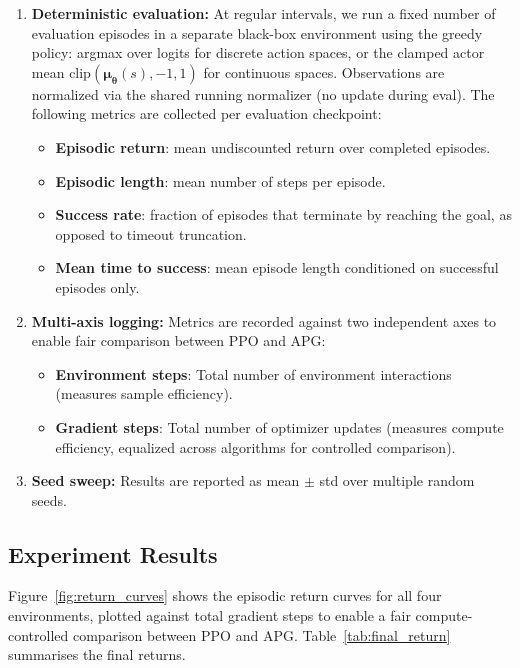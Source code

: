 \documentclass[11pt,a4paper]{article}
\newcommand{\btheta}{\bm{\theta}}
\newcommand{\bmu}{\bm{\mu}}
\begin{document}
\begin{enumerate}
  \item \textbf{Deterministic evaluation:} At regular intervals, we run a fixed number of evaluation episodes in a separate black-box environment using the greedy policy: argmax over logits for discrete action spaces, or the clamped actor mean $\text{clip}(\bmu_{\btheta}(s), -1, 1)$ for continuous spaces. Observations are normalized via the shared running normalizer (no update during eval). The following metrics are collected per evaluation checkpoint:
  \begin{itemize}
    \item \textbf{Episodic return}: mean undiscounted return over completed episodes.
    \item \textbf{Episodic length}: mean number of steps per episode.
    \item \textbf{Success rate}: fraction of episodes that terminate by reaching the goal, as opposed to timeout truncation.
    \item \textbf{Mean time to success}: mean episode length conditioned on successful episodes only.
  \end{itemize}

  \item \textbf{Multi-axis logging:} Metrics are recorded against two independent axes to enable fair comparison between PPO and APG:
  \begin{itemize}
    \item \textbf{Environment steps}: Total number of environment interactions (measures sample efficiency).
    \item \textbf{Gradient steps}: Total number of optimizer updates (measures compute efficiency, equalized across algorithms for controlled comparison).
  \end{itemize}

  \item \textbf{Seed sweep:} Results are reported as mean $\pm$ std over multiple random seeds.
\end{enumerate}

\subsection{Experiment Results}
\label{sec:results}

Figure~\ref{fig:return_curves} shows the episodic return curves for all four environments, plotted against total gradient steps to enable a fair compute-controlled comparison between PPO and APG. Table~\ref{tab:final_return} summarises the final returns.
\end{document}
